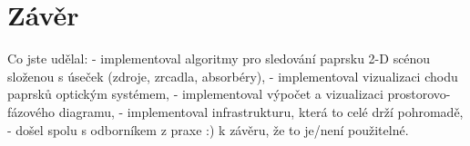 \chapter{Závěr}


Co jste udělal:
- implementoval algoritmy pro sledování paprsku 2-D scénou složenou s
úseček (zdroje, zrcadla, absorbéry),
- implementoval vizualizaci chodu paprsků optickým systémem,
- implementoval výpočet a vizualizaci prostorovo-fázového diagramu,
- implementoval infrastrukturu, která to celé drží pohromadě,
- došel spolu s odborníkem z praxe :) k závěru, že to je/není použitelné.
